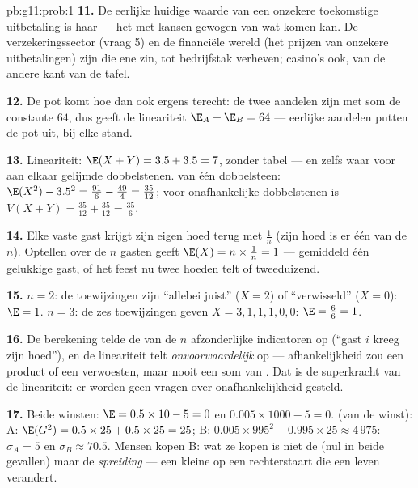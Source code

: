 \begin{solution}{pb:g11:prob:1}
\textbf{11.} De eerlijke huidige waarde van een onzekere toekomstige
uitbetaling is haar  --- het met kansen gewogen 
van wat komen kan. De verzekeringssector (vraag 5) en de financiële wereld
(het prijzen van onzekere uitbetalingen) zijn die ene zin, tot bedrijfstak
verheven; casino's ook, van de andere kant van de tafel.

\textbf{12.} De pot komt hoe dan ook ergens terecht: de twee aandelen zijn
 met som de constante $64$, dus geeft de lineariteit
$\E_A + \E_B = 64$ --- eerlijke aandelen putten de pot uit, bij elke stand.

\textbf{13.} Lineariteit: $\E(X + Y) = 3.5 + 3.5 = 7$, zonder tabel --- en
zelfs waar voor aan elkaar gelijmde dobbelstenen.  van één
dobbelsteen: $\E(X^2) - 3.5^2 = \frac{91}{6} - \frac{49}{4} = \frac{35}{12}$;
voor onafhankelijke dobbelstenen is
$V(X + Y) = \frac{35}{12} + \frac{35}{12} = \frac{35}{6}$.

\textbf{14.} Elke vaste gast krijgt zijn eigen hoed terug met 
$\frac1n$ (zijn hoed is er één van de $n$). Optellen over de $n$ gasten
geeft $\E(X) = n \times \frac1n = 1$ --- gemiddeld één gelukkige gast, of
het feest nu twee hoeden telt of tweeduizend.

\textbf{15.} $n = 2$: de toewijzingen zijn ``allebei juist'' ($X = 2$) of
``verwisseld'' ($X = 0$): $\E = 1$. $n = 3$: de zes toewijzingen geven
$X = 3, 1, 1, 1, 0, 0$: $\E = \frac{6}{6} = 1$.

\textbf{16.} De berekening telde de  van de $n$
afzonderlijke indicatoren op (``gast $i$ kreeg zijn hoed''), en de
lineariteit telt  \emph{onvoorwaardelijk} op ---
afhankelijkheid zou een product of een  verwoesten, maar nooit een
som van . Dat is de superkracht van de lineariteit: er
worden geen vragen over onafhankelijkheid gesteld.

\textbf{17.} Beide winsten: $\E = 0.5 \times 10 - 5 = 0$ en
$0.005 \times 1000 - 5 = 0$.  (van de winst): A:
$\E(G^2) = 0.5 \times 25 + 0.5 \times 25 = 25$; B:
$0.005 \times 995^2 + 0.995 \times 25 \approx 4\,975$: $\sigma_A = 5$ en
$\sigma_B \approx 70.5$. Mensen kopen B: wat ze kopen is niet de
 (nul in beide gevallen) maar de \emph{spreiding} --- een
kleine  op een rechterstaart die een leven verandert.


\end{solution}
